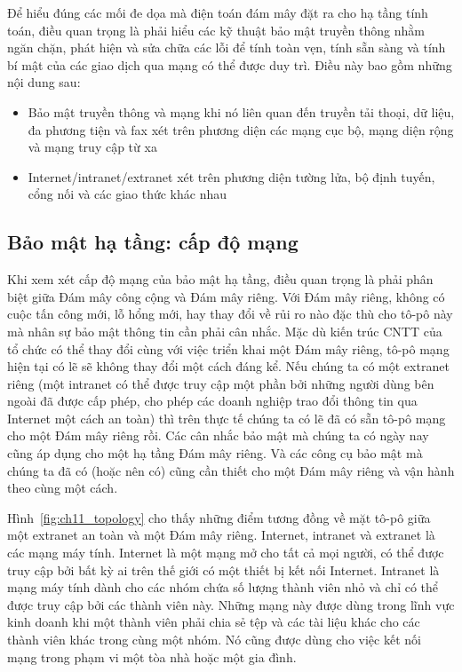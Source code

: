 Để hiểu đúng các mối đe dọa mà điện toán đám mây đặt ra cho hạ tầng tính toán, điều quan trọng là phải hiểu các kỹ thuật bảo mật truyền thông nhằm ngăn chặn, phát hiện và sửa chữa các lỗi để tính toàn vẹn, tính sẵn sàng và tính bí mật của các giao dịch qua mạng có thể được duy trì. Điều này bao gồm những nội dung sau:

\begin{itemize}
  \item Bảo mật truyền thông và mạng khi nó liên quan đến truyền tải thoại, dữ liệu, đa phương tiện và fax xét trên phương diện các mạng cục bộ, mạng diện rộng và mạng truy cập từ xa
  \item Internet/intranet/extranet xét trên phương diện tường lửa, bộ định tuyến, cổng nối và các giao thức khác nhau
\end{itemize}

\subsection{Bảo mật hạ tầng: cấp độ mạng}

Khi xem xét cấp độ mạng của bảo mật hạ tầng, điều quan trọng là phải phân biệt giữa Đám mây công cộng và Đám mây riêng. Với Đám mây riêng, không có cuộc tấn công mới, lỗ hổng mới, hay thay đổi về rủi ro nào đặc thù cho tô-pô này mà nhân sự bảo mật thông tin cần phải cân nhắc. Mặc dù kiến trúc CNTT của tổ chức có thể thay đổi cùng với việc triển khai một Đám mây riêng, tô-pô mạng hiện tại có lẽ sẽ không thay đổi một cách đáng kể. Nếu chúng ta có một extranet riêng (một intranet có thể được truy cập một phần bởi những người dùng bên ngoài đã được cấp phép, cho phép các doanh nghiệp trao đổi thông tin qua Internet một cách an toàn) thì trên thực tế chúng ta có lẽ đã có sẵn tô-pô mạng cho một Đám mây riêng rồi. Các cân nhắc bảo mật mà chúng ta có ngày nay cũng áp dụng cho một hạ tầng Đám mây riêng. Và các công cụ bảo mật mà chúng ta đã có (hoặc nên có) cũng cần thiết cho một Đám mây riêng và vận hành theo cùng một cách.

Hình~\ref{fig:ch11_topology} cho thấy những điểm tương đồng về mặt tô-pô giữa một extranet an toàn và một Đám mây riêng. Internet, intranet và extranet là các mạng máy tính. Internet là một mạng mở cho tất cả mọi người, có thể được truy cập bởi bất kỳ ai trên thế giới có một thiết bị kết nối Internet. Intranet là mạng máy tính dành cho các nhóm chứa số lượng thành viên nhỏ và chỉ có thể được truy cập bởi các thành viên này. Những mạng này được dùng trong lĩnh vực kinh doanh khi một thành viên phải chia sẻ tệp và các tài liệu khác cho các thành viên khác trong cùng một nhóm. Nó cũng được dùng cho việc kết nối mạng trong phạm vi một tòa nhà hoặc một gia đình.

